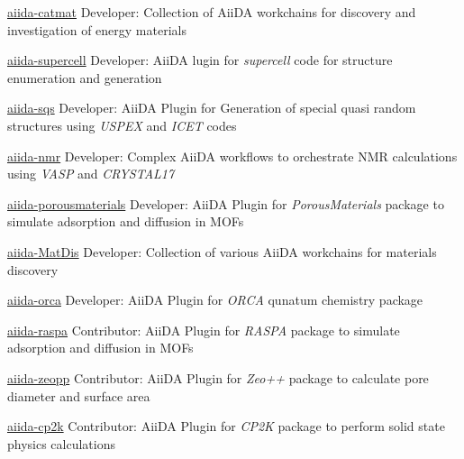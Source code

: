 


\begin{cvskillsnoncentered}
    
\cvskill
    {\href{https://github.com/pzarabadip/aiida-catmat}{aiida-catmat}} %
    {Developer: Collection of AiiDA workchains for discovery and investigation of energy materials}

\cvskill
    {\href{https://github.com/pzarabadip/aiida-supercell}{aiida-supercell}} %
    {Developer: AiiDA lugin for \textit{supercell} code for structure enumeration and generation}

\cvskill
    {\href{https://github.com/pzarabadip/aiida-sqs}{aiida-sqs}} %
    {Developer: AiiDA Plugin for Generation of special quasi random structures using \textit{USPEX} and \textit{ICET} codes}

\cvskill
    {\href{https://github.com/pzarabadip/aiida-nmr}{aiida-nmr}} %
    {Developer: Complex AiiDA workflows to orchestrate NMR calculations using \textit{VASP} and \textit{CRYSTAL17}}

\cvskill
    {\href{https://github.com/pzarabadip/aiida-porousmaterials}{aiida-porousmaterials}} %
    {Developer: AiiDA Plugin for \textit{PorousMaterials} package to simulate adsorption and diffusion in MOFs}

\cvskill
    {\href{https://github.com/pzarabadip/aiida-MatDis}{aiida-MatDis}} %
    {Developer: Collection of various AiiDA workchains for materials discovery}

\cvskill
    {\href{https://github.com/pzarabadip/aiida-orca}{aiida-orca}} %
    {Developer: AiiDA Plugin for \textit{ORCA} qunatum chemistry package}

\cvskill
    {\href{https://github.com/yakutovicha/aiida-raspa}{aiida-raspa}} %
    {Contributor: AiiDA Plugin for \textit{RASPA} package to simulate adsorption and diffusion in MOFs}

\cvskill
    {\href{https://github.com/ltalirz/aiida-zeopp}{aiida-zeopp}} %
    {Contributor: AiiDA Plugin for \textit{Zeo++} package to calculate pore diameter and surface area}

\cvskill
    {\href{https://github.com/aiidateam/aiida-cp2k}{aiida-cp2k}} %
    {Contributor: AiiDA Plugin for \textit{CP2K} package to perform solid state physics calculations} 

    
\end{cvskillsnoncentered}
\clearpage
